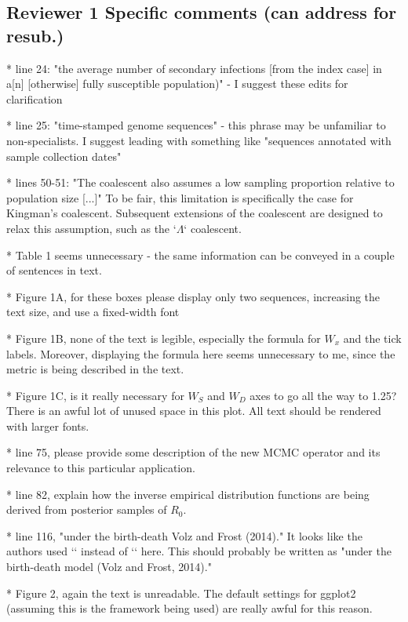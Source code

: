 \documentclass{article}
\begin{document}
\subsection*{Reviewer 1 Specific comments (can address for resub.)}
\begin{footnotesize}

* line 24: "the average number of secondary infections [from the index case] in a[n] [otherwise] fully susceptible population)" - I suggest these edits for clarification

* line 25: "time-stamped genome sequences" - this phrase may be unfamiliar to non-specialists.  I suggest leading with something like "sequences annotated with sample collection dates"

* lines 50-51: "The coalescent also assumes a low sampling proportion relative to population size [...]"  To be fair, this limitation is specifically the case for Kingman's coalescent.  Subsequent extensions of the coalescent are designed to relax this assumption, such as the `$\Lambda$` coalescent.

* Table 1 seems unnecessary - the same information can be conveyed in a couple of sentences in text.

* Figure 1A, for these boxes please display only two sequences, increasing the text size, and use a fixed-width font

* Figure 1B, none of the text is legible, especially the formula for $W_{x}$ and the tick labels.  Moreover, displaying the formula here seems unnecessary to me, since the metric is being described in the text.

* Figure 1C, is it really necessary for $W_{S}$ and $W_{D}$ axes to go all the way to 1.25?  There is an awful lot of unused space in this plot.  All text should be rendered with larger fonts.

* line 75, please provide some description of the new MCMC operator and its relevance to this particular application.

* line 82, explain how the inverse empirical distribution functions are being derived from posterior samples of $R_{0}$.  

* line 116, "under the birth-death Volz and Frost (2014)."  It looks like the authors used `\citet{}` instead of `\citep{}` here.  This should probably be written as "under the birth-death model (Volz and Frost, 2014)."

* Figure 2, again the text is unreadable.  The default settings for ggplot2 (assuming this is the framework being used) are really awful for this reason.


\end{footnotesize}
\end{document}
